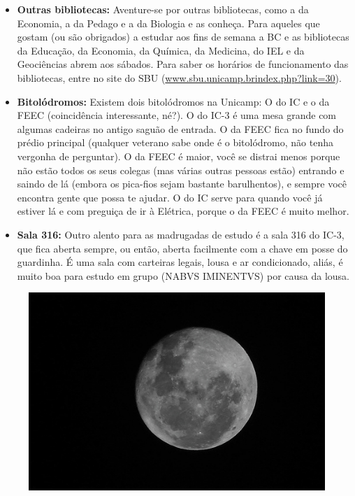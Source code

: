 \begin{itemize}
\item  \textbf{Outras bibliotecas:} Aventure-se por outras bibliotecas, como a da Economia, a da Pedago e a da Biologia e as conheça. Para aqueles que gostam (ou são obrigados) a estudar aos fins de semana a BC e as bibliotecas da Educação, da Economia, da Química, da Medicina, do IEL e da Geociências abrem aos sábados. Para saber os horários de funcionamento das bibliotecas, entre no site do SBU (\url{www.sbu.unicamp.brindex.php?link=30}).
\end{itemize}

\begin{itemize}
\item  \textbf{Bitolódromos:} Existem dois bitolódromos na Unicamp: O do IC e o da FEEC (coincidência interessante, né?). O do IC-3 é uma mesa grande com algumas cadeiras no antigo saguão de entrada. O da FEEC fica no fundo do prédio principal (qualquer veterano sabe onde é o bitolódromo, não tenha vergonha de perguntar). O da FEEC é maior, você se distrai menos porque não estão todos os seus colegas (mas várias outras pessoas estão) entrando e saindo de lá (embora os pica-fios sejam bastante barulhentos), e sempre você encontra gente que possa te ajudar. O do IC serve para quando você já estiver lá e com preguiça de ir à Elétrica, porque o da FEEC é muito melhor.
\end{itemize}

\begin{itemize}
\item  \textbf{Sala 316:} Outro alento para as madrugadas de estudo é a sala 316 do IC-3, que fica aberta sempre, ou então, aberta facilmente com a chave em posse do guardinha. É uma sala com carteiras legais, lousa e ar condicionado, aliás, é muito boa para estudo em grupo (NABVS IMINENTVS) por causa da lousa.
\end{itemize}

\begin{figure}[h!]
    \centering
    \includegraphics[scale=0.50, keepaspectratio=true]{img/imgs/11-lugares_estudar/-076.jpg}
\end{figure}

